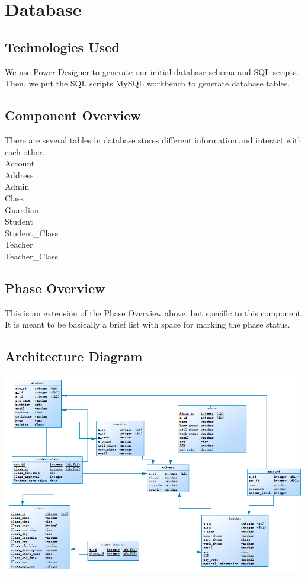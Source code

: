 \section{Database}

\subsection{Technologies  Used}
We use Power Designer to generate our initial database schema and SQL scripts. Then, we put the SQL scripts MySQL workbench to generate database tables.

\subsection{Component  Overview}
There are several tables in database stores different information and interact with each other.\\
Account\\
Address\\
Admin\\
Class\\
Guardian\\
Student\\
Student\_Class\\
Teacher\\
Teacher\_Class\\

\subsection{Phase Overview}
This is an extension of the Phase Overview above, but specific to this component. 
 It is meant to be basically a brief list with space for marking the phase status. 

\subsection{ Architecture  Diagram}
\includegraphics[scale=0.8]{pics/database.png}\\


